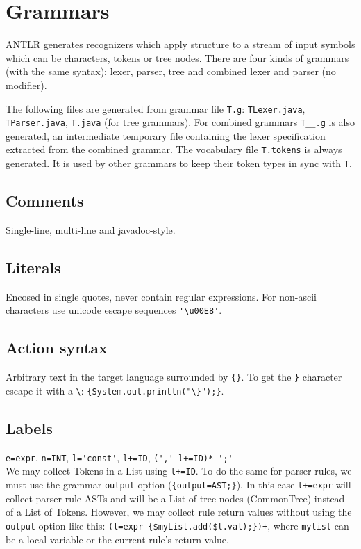 \section{Grammars}

ANTLR generates recognizers which apply structure to a stream of input symbols
which can be characters, tokens or tree nodes.
There are four kinds of grammars (with the same syntax):
lexer, parser, tree and combined lexer and parser (no modifier).

The following files are generated from grammar file \verb=T.g=:
\verb=TLexer.java=, \verb=TParser.java=, \verb=T.java= (for tree grammars).
For combined grammars \verb=T__.g= is also generated,
an intermediate temporary file containing the lexer specification
extracted from the combined grammar.
The vocabulary file \verb=T.tokens= is always generated.
It is used by other grammars to keep their token types in sync with \verb=T=.


\subsection{Comments}
Single-line, multi-line and javadoc-style.


\subsection{Literals}
Encosed in single quotes, never contain regular expressions.
For non-ascii characters use unicode escape sequences \verb='\u00E8'=.


\subsection{Action syntax}
Arbitrary text in the target language surrounded by \verb={}=.
To get the \verb=}= character escape it with a \verb=\=:
\verb={System.out.println("\}");}=.


\subsection{Labels}

\verb|e=expr|, \verb|n=INT|, \verb|l='const'|, \verb|l+=ID|,
\verb|(',' l+=ID)* ';'|\\
We may collect Tokens in a List using \verb|l+=ID|.
To do the same for parser rules,
we must use the grammar \verb=output= option (\verb|{output=AST;}|).
In this case \verb|l+=expr| will collect parser rule ASTs
and will be a List of tree nodes (CommonTree) instead of a List of Tokens.
However, we may collect rule return values
without using the \verb=output= option like this:
\verb|(l=expr {$myList.add($l.val);})+|,
where \verb=mylist= can be a local variable or the current rule's return value.


